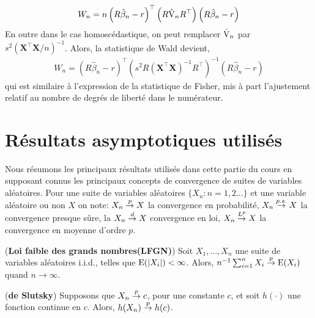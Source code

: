 \begin{align*}
W_n = n\left(R\hat{\beta}_n- r\right)^\top\left(R\hat{\operatorname{V}}_nR^\top\right)\left(R\hat{\beta}_n- r\right)
\end{align*}
En outre dans le cas homoscédastique, on peut remplacer $\hat{\operatorname{V}}_n$ par $s^2(\mathbf{X}^\top\mathbf{X}/n)^{-1}$. Alors, la statistique de Wald devient,
\begin{align*}
W_n = \left(R\hat{\beta}_n- r\right)^\top\left(s^2R(\mathbf{X}^\top\mathbf{X})^{-1}R^\top\right)^{-1}\left(R\hat{\beta}_n-r\right)
\end{align*}
qui est similaire à l'expression de la statistique de Fisher, mis à part l'ajustement relatif au nombre de degrés de liberté dans le numérateur.


\newpage


\appendix

\section{Résultats asymptotiques utilisés}

Nous résumons les principaux résultats utilisés dans cette partie du cours en supposant connus les principaux concepts de 
convergence de suites de variables aléatoires. Pour une suite de variables aléatoires 
$\{X_n: n = 1, 2\ldots\}$ et une variable aléatoire ou non $X$ on note: $X_n\overset{p}{\rightarrow} X$ 
la convergence en probabilité, $X_n\overset{p.s.}{\rightarrow} X$ la convergence presque sûre, la $X_n\overset{d}{\rightarrow} X$
convergence en loi, $X_n\overset{L^p}{\rightarrow} X$ la convergence en moyenne d'ordre $p$.

\begin{theoreme}(\textbf{Loi faible des grands nombres(LFGN)})
    Soit $X_1, \ldots, X_n$ une suite de variables aléatoires i.i.d., telles que $\operatorname{E}(\left\vert {X_i} \right\vert) <\infty$. Alors, 
    $n^{-1}\sum_{i=1}^n X_i\overset{p}{\rightarrow} \operatorname{E}(X_i)$ quand $n\to\infty$.
\end{theoreme}

\begin{theoreme}(\textbf{de Slutsky})
Supposons que $X_n \overset{p}{\rightarrow} c$, pour une constante $c$, et soit $h(\cdot)$ une fonction continue en $c$. Alors, 
$h(X_n)\overset{p}{\rightarrow} h(c)$.
\end{theoreme}

